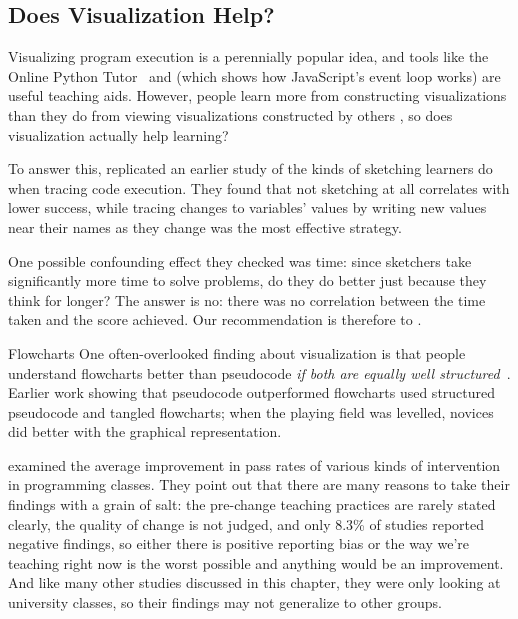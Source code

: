 \subsection*{Does Visualization Help?}

Visualizing program execution is a perennially popular idea,
and tools like the Online Python Tutor~\cite{Guo2013}
and 
(which shows how JavaScript's event loop works)
are useful teaching aids.
However,
people learn more from constructing visualizations
than they do from viewing visualizations constructed by others \cite{Stas1998,Ceti2016},
so does visualization actually help learning?

To answer this,
\cite{Cunn2017} replicated an earlier study of the kinds of sketching learners do when tracing code execution.
They found that not sketching at all correlates with lower success,
while tracing changes to variables' values by writing new values near their names as they change was the most effective strategy.

One possible confounding effect they checked was time:
since sketchers take significantly more time to solve problems,
do they do better just because they think for longer?
The answer is no:
there was no correlation between the time taken and the score achieved.
Our recommendation is therefore to .

\begin{aside}{Flowcharts}
  One often-overlooked finding about visualization is that
  people understand flowcharts better than pseudocode \emph{if both are equally well structured}~\cite{Scan1989}.
  Earlier work showing that pseudocode outperformed flowcharts used structured pseudocode and tangled flowcharts;
  when the playing field was levelled,
  novices did better with the graphical representation.
\end{aside}


\cite{Viha2014} examined the average improvement in pass rates of various kinds of intervention in programming classes.
They point out that there are many reasons to take their findings with a grain of salt:
the pre-change teaching practices are rarely stated clearly,
the quality of change is not judged,
and only 8.3\% of studies reported negative findings,
so either there is positive reporting bias
or the way we're teaching right now is the worst possible and anything would be an improvement.
And like many other studies discussed in this chapter,
they were only looking at university classes,
so their findings may not generalize to other groups.

